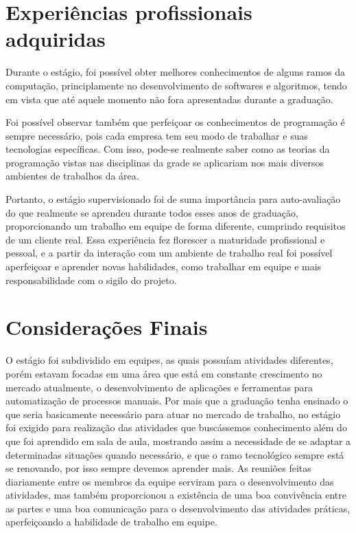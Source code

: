 \documentclass[english,brazil,oneside]{ifestagio}
\begin{document}

\chapter{Experiências profissionais adquiridas}

Durante o estágio, foi possível obter melhores conhecimentos de alguns ramos da
computação, principlamente no desenvolvimento de softwares e algoritmos, tendo em vista que até aquele momento não fora apresentadas durante a graduação.

Foi possível observar também que perfeiçoar os conhecimentos de programação é sempre
necessário, pois cada empresa tem seu modo de trabalhar e suas tecnologias específicas. Com
isso, pode-se realmente saber como as teorias da programação vistas nas disciplinas da grade
se aplicariam nos mais diversos ambientes de trabalhos da área.

Portanto, o estágio supervisionado foi de suma importância para auto-avaliação do que
realmente se aprendeu durante todos esses anos de graduação, proporcionando um trabalho
em equipe de forma diferente, cumprindo requisitos de um cliente real. Essa experiência
fez florescer a maturidade profissional e pessoal, e a partir da interação com um ambiente de trabalho real foi possível aperfeiçoar e aprender novas habilidades, como trabalhar em equipe e mais responsabilidade com o sigilo do projeto. 


\chapter{Considerações Finais}

O estágio foi subdividido em equipes, as quais possuíam atividades diferentes, porém
estavam focadas em uma área que está em constante crescimento no mercado atualmente, o
desenvolvimento de aplicações e ferramentas para automatização de processos manuais. Por mais que a graduação tenha ensinado o que
seria basicamente necessário para atuar no mercado de trabalho, no estágio foi exigido para
realização das atividades que buscássemos conhecimento além do que foi aprendido em sala
de aula, mostrando assim a necessidade de se adaptar a determinadas situações quando
necessário, e que o ramo tecnológico sempre está se renovando, por isso sempre devemos
aprender mais.
As reuniões feitas diariamente entre os membros da equipe serviram para o
desenvolvimento das atividades, mas também proporcionou a existência de uma boa
convivência entre as partes e uma boa comunicação para o desenvolvimento das atividades
práticas, aperfeiçoando a habilidade de trabalho em equipe.
\end{document}
